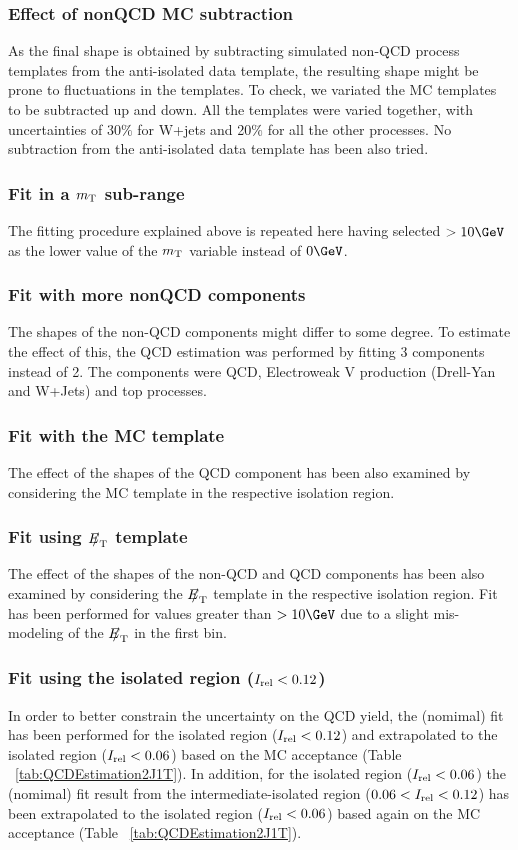 \subsubsection{Effect of nonQCD MC subtraction}
As the final shape is obtained by subtracting simulated non-QCD process templates from the anti-isolated data template, the resulting shape might be prone to fluctuations in the templates. To check, we variated the MC templates to be subtracted up and down. All the templates were
varied together, with uncertainties of 30$\%$ for W+jets and 20$\%$ for all the other processes. No subtraction from the anti-isolated data template has been also tried.

\subsubsection{Fit in a $m_{\mathrm{\rm T}}$ sub-range}
The fitting procedure explained above is repeated here having selected $>10 \GeV$ as the lower value of the $m_{\mathrm{\rm T}}$ variable instead of $0 \GeV$.  

\subsubsection{Fit with more nonQCD components}
The shapes of the non-QCD components might differ to some degree. To estimate the effect of this, the QCD estimation was performed by fitting 3 components instead of 2. The components were QCD, Electroweak V production (Drell-Yan and W+Jets) and top processes. 

\subsubsection{Fit with the MC template}
The effect of the shapes of the QCD component has been also examined by considering the MC template in the respective isolation region.

\subsubsection{Fit using ${E\!\!\!/}_{\mathrm{T}}$ template}
The effect of the shapes of the non-QCD and QCD components has been also examined by considering the  ${E\!\!\!/}_{\mathrm{T}}$ template in the respective isolation region. Fit has been performed for values greater than $>10 \GeV$ due to a slight mis-modeling of the ${E\!\!\!/}_{\mathrm{T}}$ in the first bin.

\subsubsection{Fit using the isolated region ($I_{\mathrm{rel}} < 0.12$) }
In order to better constrain the uncertainty on the QCD yield, the (nomimal) fit has been performed for the isolated region ($I_{\mathrm{rel}} < 0.12$) and extrapolated to the isolated region ($I_{\mathrm{rel}} < 0.06$) based on the MC acceptance (Table ~\ref{tab:QCDEstimation2J1T}). In addition, for the isolated region ($I_{\mathrm{rel}} < 0.06$) the (nomimal) fit result from the intermediate-isolated region ($0.06 <I_{\mathrm{rel}} < 0.12$) has been  extrapolated to the isolated region ($I_{\mathrm{rel}} < 0.06$) based again on the MC acceptance (Table ~\ref{tab:QCDEstimation2J1T}).

